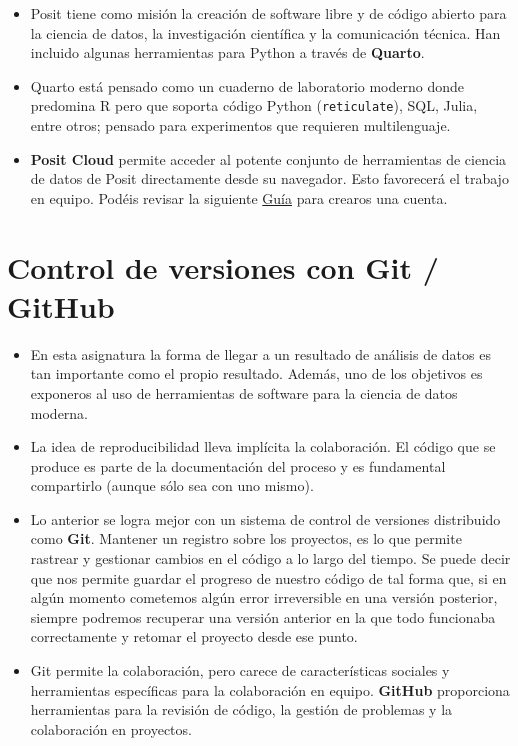 \documentclass[
  letterpaper,
  DIV=11,
  numbers=noendperiod]{scrreprt}
\begin{document}
\begin{itemize}
\item
  Posit tiene como misión la creación de software libre y de código
  abierto para la ciencia de datos, la investigación científica y la
  comunicación técnica. Han incluido algunas herramientas para Python a
  través de \textbf{Quarto}.
\item
  Quarto está pensado como un cuaderno de laboratorio moderno donde
  predomina R pero que soporta código Python (\texttt{reticulate}), SQL,
  Julia, entre otros; pensado para experimentos que requieren
  multilenguaje.
\item
  \textbf{Posit Cloud} permite acceder al potente conjunto de
  herramientas de ciencia de datos de Posit directamente desde su
  navegador. Esto favorecerá el trabajo en equipo. Podéis revisar la
  siguiente \href{https://posit.cloud/learn/guide}{Guía} para crearos
  una cuenta.
\end{itemize}

\section{Control de versiones con Git /
GitHub}\label{control-de-versiones-con-git-github}

\begin{itemize}
\item
  En esta asignatura la forma de llegar a un resultado de análisis de
  datos es tan importante como el propio resultado. Además, uno de los
  objetivos es exponeros al uso de herramientas de software para la
  ciencia de datos moderna.
\item
  La idea de reproducibilidad lleva implícita la colaboración. El código
  que se produce es parte de la documentación del proceso y es
  fundamental compartirlo (aunque sólo sea con uno mismo).
\item
  Lo anterior se logra mejor con un sistema de control de versiones
  distribuido como \textbf{Git}. Mantener un registro sobre los
  proyectos, es lo que permite rastrear y gestionar cambios en el código
  a lo largo del tiempo. Se puede decir que nos permite guardar el
  progreso de nuestro código de tal forma que, si en algún momento
  cometemos algún error irreversible en una versión posterior, siempre
  podremos recuperar una versión anterior en la que todo funcionaba
  correctamente y retomar el proyecto desde ese punto.
\item
  Git permite la colaboración, pero carece de características sociales y
  herramientas específicas para la colaboración en equipo.
  \textbf{GitHub} proporciona herramientas para la revisión de código,
  la gestión de problemas y la colaboración en proyectos.
\end{itemize}
\end{document}
